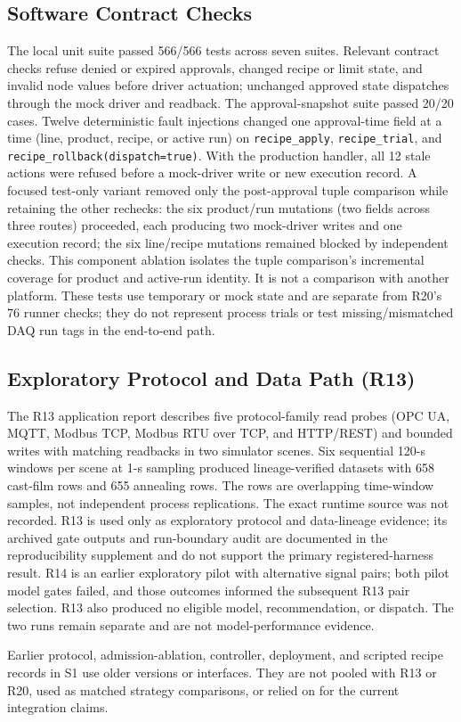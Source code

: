 \subsection{Software Contract Checks}
The local unit suite passed 566/566 tests across seven suites. Relevant
contract checks refuse denied or expired approvals, changed recipe or limit
state, and invalid node values before driver actuation; unchanged approved
state dispatches through the mock driver and readback. The approval-snapshot
suite passed 20/20 cases. Twelve deterministic fault injections changed one
approval-time field at a time (line, product, recipe, or active run) on
\texttt{recipe\_apply}, \texttt{recipe\_trial}, and
\texttt{recipe\_rollback(dispatch=true)}. With the production handler, all
12 stale actions were refused before a mock-driver write or new execution
record. A focused test-only variant removed only the post-approval tuple
comparison while retaining the other rechecks: the six product/run mutations
(two fields across three routes) proceeded, each producing two mock-driver
writes and one execution record; the six line/recipe mutations remained
blocked by independent checks. This component ablation isolates the tuple
comparison's incremental coverage for product and active-run identity. It is
not a comparison with another platform. These tests use temporary or mock
state and are separate from R20's 76 runner checks; they do not represent
process trials or test missing/mismatched DAQ run tags in the end-to-end path.

\subsection{Exploratory Protocol and Data Path (R13)}
\label{sec:crossscene}
The R13 application report describes five protocol-family read probes (OPC UA,
MQTT, Modbus TCP, Modbus RTU over TCP, and HTTP/REST) and bounded writes with
matching readbacks in two simulator scenes. Six sequential 120-s windows per
scene at 1-s sampling produced lineage-verified datasets with 658 cast-film
rows and 655 annealing rows. The rows are overlapping time-window samples, not
independent process replications. The exact runtime source was not recorded. R13 is
used only as exploratory protocol and data-lineage evidence; its archived gate
outputs and run-boundary audit are documented in the reproducibility
supplement and do not support the primary registered-harness result.
R14 is an earlier exploratory pilot with alternative signal pairs; both pilot
model gates failed, and those outcomes informed the subsequent R13 pair
selection. R13 also produced no eligible model, recommendation, or dispatch.
The two runs remain separate and are not model-performance evidence.

Earlier protocol, admission-ablation, controller, deployment, and scripted
recipe records in S1 use older versions or interfaces. They are not pooled
with R13 or R20, used as matched strategy comparisons, or relied on for the
current integration claims.

